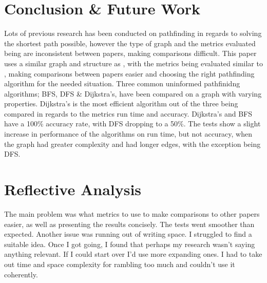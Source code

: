 \documentclass{csfourzero}
\begin{document}
\section{Conclusion \& Future Work}
\label{sec:conc}
Lots of previous research has been conducted on pathfinding in regards to solving the shortest path possible, however the type of graph and the metrics evaluated being are inconsistent between papers, making comparisons difficult. This paper uses a similar graph and structure as \cite{4631975}, with the metrics being evaluated similar to \cite{rachmawati2020analysis}, making comparisons between papers easier and choosing the right pathfinding algorithm for the needed situation. Three common uninformed pathfinidng algorithms; BFS, DFS \& Dijkstra's, have been compared on a graph with varying properties. Dijkstra’s is the most efficient algorithm out of the three being compared in regards to the metrics run time and accuracy. Dijkstra's and BFS have a 100\% accuracy rate, with DFS dropping to a 50\%. The tests show a slight increase in performance of the algorithms on run time, but not accuracy, when the graph had greater complexity and had longer edges, with the exception being DFS. 

\section{Reflective Analysis}
The main problem was what metrics to use to make comparisons to other papers easier, as well as presenting the results concisely. The tests went smoother than expected. Another issue was running out of writing space. I struggled to find a suitable idea. Once I got going, I found that perhaps my research wasn't saying anything relevant. If I could start over I'd use more expanding ones. I had to take out time and space complexity for rambling too much and couldn't use it coherently. 

\newpage



\listoffigures 

\listoftables 
\end{document}
